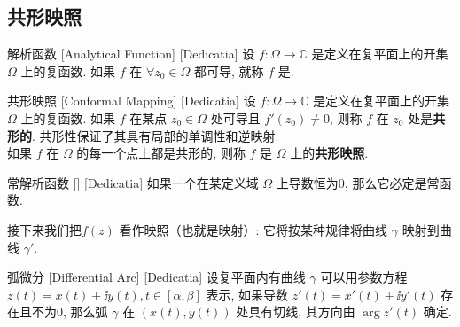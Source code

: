 \documentclass[UTF8]{ctexart}
\begin{document}

    \subsection{共形映照}

        \begin{dfn}
            [UUID]
            {解析函数}
            [Analytical Function]
            [Dedicatia]
            设 \(f: \Omega \to \mathbb{C}\) 是定义在复平面上的开集 \(\Omega\) 上的复函数. 如果 \(f\) 在 \(\forall z_0 \in \Omega\) 都可导, 就称 \(f\) 是. 
        \end{dfn}

        \begin{dfn}
            [ConformalMapping]
            {共形映照}
            [Conformal Mapping]
            [Dedicatia]
            设 \(f: \Omega \to \mathbb{C}\) 是定义在复平面上的开集 \(\Omega\) 上的复函数. 如果 \(f\) 在某点 \(z_0 \in \Omega\) 处可导且 \(f'(z_0) \neq 0\), 则称 \(f\) 在 \(z_0\) 处是\textbf{共形的}. 共形性保证了其具有局部的单调性和逆映射. \\
            如果 \(f\) 在 \(\Omega\) 的每一个点上都是共形的, 则称 \(f\) 是 \(\Omega\) 上的\textbf{共形映照}. 
        \end{dfn}

        \begin{ppt}
            [TrivialAnalyticalFunction]
            {常解析函数}
            []
            [Dedicatia]
            如果一个 在某定义域 \(\Omega\) 上导数恒为0, 那么它必定是常函数. 
        \end{ppt}

        接下来我们把  \(f(z)\) 看作映照（也就是映射）: 它将按某种规律将曲线 \(\gamma\) 映射到曲线 \(\gamma'\). 

        \begin{dfn}
            [UUID]
            {弧微分}
            [Differential Arc]
            [Dedicatia]
            设复平面内有曲线 \(\gamma\) 可以用参数方程 \(z(t)=x(t)+\ii y(t), t\in[\alpha,\beta]\) 表示, 如果导数 \(z'(t)=x'(t)+\ii y'(t)\) 存在且不为0, 那么弧 \(\gamma\) 在 \((x(t),y(t))\) 处具有切线, 其方向由 \(\arg z'(t)\) 确定. 
        \end{dfn}
\end{document}
